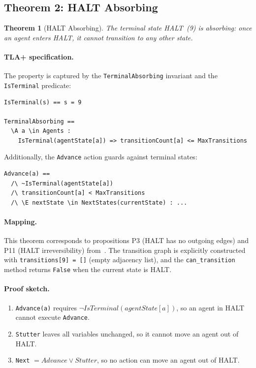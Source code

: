 \documentclass[11pt]{article}
\newtheorem{theorem}{Theorem}
\begin{document}
\subsection{Theorem 2: HALT Absorbing}

\begin{theorem}[HALT Absorbing]
The terminal state HALT~(9) is absorbing: once an agent enters HALT, it cannot
transition to any other state.
\end{theorem}

\paragraph{TLA+ specification.} The property is captured by the
\texttt{TerminalAbsorbing} invariant and the \texttt{IsTerminal} predicate:

\begin{lstlisting}
IsTerminal(s) == s = 9

TerminalAbsorbing ==
  \A a \in Agents :
    IsTerminal(agentState[a]) => transitionCount[a] <= MaxTransitions
\end{lstlisting}

Additionally, the \texttt{Advance} action guards against terminal states:
\begin{lstlisting}
Advance(a) ==
  /\ ~IsTerminal(agentState[a])
  /\ transitionCount[a] < MaxTransitions
  /\ \E nextState \in NextStates(currentState) : ...
\end{lstlisting}

\paragraph{Mapping.} This theorem corresponds to propositions P3 (HALT has no
outgoing edges) and P11 (HALT irreversibility) from~\cite{maref-w3}. The
transition graph is explicitly constructed with \texttt{transitions[9] = []}
(empty adjacency list), and the \texttt{can\_transition} method returns
\texttt{False} when the current state is HALT.

\paragraph{Proof sketch.}
\begin{enumerate}
  \item \texttt{Advance(a)} requires $\neg\mathit{IsTerminal}(\mathit{agentState}[a])$,
    so an agent in HALT cannot execute \texttt{Advance}.
  \item \texttt{Stutter} leaves all variables unchanged, so it cannot move an
    agent out of HALT.
  \item \texttt{Next} $= \mathit{Advance} \lor \mathit{Stutter}$, so no action
    can move an agent out of HALT.
\end{enumerate}
\end{document}
